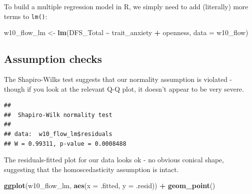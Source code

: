 \documentclass[
]{book}
\newenvironment{Shaded}{\begin{snugshade}}{\end{snugshade}}
\newcommand{\AttributeTok}[1]{\textcolor[rgb]{0.13,0.29,0.53}{#1}}
\newcommand{\FunctionTok}[1]{\textcolor[rgb]{0.13,0.29,0.53}{\textbf{#1}}}
\newcommand{\NormalTok}[1]{#1}
\newcommand{\OtherTok}[1]{\textcolor[rgb]{0.56,0.35,0.01}{#1}}
\newcommand{\SpecialCharTok}[1]{\textcolor[rgb]{0.81,0.36,0.00}{\textbf{#1}}}
\begin{document}
To build a multiple regression model in R, we simply need to add (literally) more terms to \texttt{lm()}:

\begin{Shaded}
\begin{Highlighting}[]
\NormalTok{w10\_flow\_lm }\OtherTok{\textless{}{-}} \FunctionTok{lm}\NormalTok{(DFS\_Total }\SpecialCharTok{\textasciitilde{}}\NormalTok{ trait\_anxiety }\SpecialCharTok{+}\NormalTok{ openness, }\AttributeTok{data =}\NormalTok{ w10\_flow)}
\end{Highlighting}
\end{Shaded}

\hypertarget{assumption-checks-5}{%
\subsection{Assumption checks}\label{assumption-checks-5}}

The Shapiro-Wilks test suggests that our normality assumption is violated - though if you look at the relevant Q-Q plot, it doesn't appear to be very severe.

\begin{Shaded}
\end{Shaded}

\begin{verbatim}
## 
##  Shapiro-Wilk normality test
## 
## data:  w10_flow_lm$residuals
## W = 0.99311, p-value = 0.0008488
\end{verbatim}

The residuals-fitted plot for our data looks ok - no obvious conical shape, suggesting that the homoscedasticity assumption is intact.

\begin{Shaded}
\begin{Highlighting}[]
\FunctionTok{ggplot}\NormalTok{(w10\_flow\_lm, }\FunctionTok{aes}\NormalTok{(}\AttributeTok{x =}\NormalTok{ .fitted, }\AttributeTok{y =}\NormalTok{ .resid)) }\SpecialCharTok{+}
  \FunctionTok{geom\_point}\NormalTok{()}
\end{Highlighting}
\end{Shaded}
\end{document}
